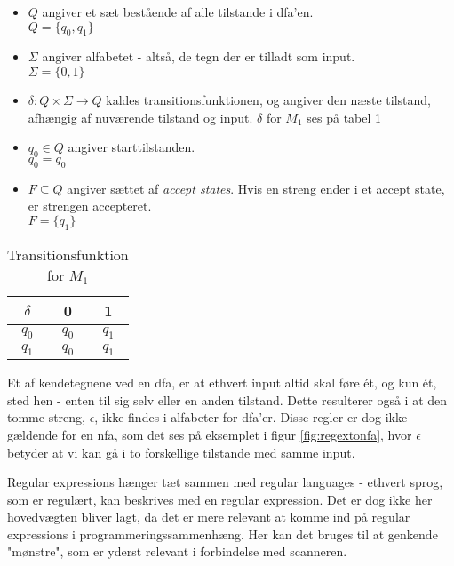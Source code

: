\begin{itemize}
    \item $Q$ angiver et sæt bestående af alle tilstande i \gls{dfa}'en.\\
        $Q = \{q_0, q_1\}$
    \item $\Sigma$ angiver alfabetet - altså, de tegn der er tilladt som input.\\
        $\Sigma = \{0, 1\}$
    \item $\delta: Q \times \Sigma \rightarrow Q$ kaldes transitionsfunktionen, og angiver den næste tilstand, afhængig af nuværende tilstand og input. $\delta$ for $M_1$ ses på tabel \ref{tab:transfunk_m1}
    \item $q_0 \in Q$ angiver starttilstanden.\\
        $q_0 = q_0$
    \item $F \subseteq Q$ angiver sættet af \textit{accept states}. Hvis en streng ender i et accept state, er strengen accepteret.\\
        $F = \{q_1\}$
\end{itemize}

\begin{table}[H]
    \centering
        \begin{tabular}{ c|c c }
        \centering
            $\delta$ & 0 & 1\\ \hline 
            $q_0$ & $q_0$ & $q_1$\\
            $q_1$ & $q_0$ & $q_1$\\
        \end{tabular}
    \caption{Transitionsfunktion for $M_1$}
    \label{tab:transfunk_m1}
\end{table}

\noindent Et af kendetegnene ved en \gls{dfa}, er at ethvert input altid skal føre ét, og kun ét, sted hen - enten til sig selv eller en anden tilstand. Dette resulterer også i at den tomme streng, $\epsilon$, ikke findes i alfabeter for \gls{dfa}'er. Disse regler er dog ikke gældende for en \gls{nfa}, som det ses på eksemplet i figur \ref{fig:regextonfa}, hvor $\epsilon$ betyder at vi kan gå i to forskellige tilstande med samme input.

Regular expressions hænger tæt sammen med regular languages - ethvert sprog, som er regulært, kan beskrives med en regular expression. Det er dog ikke her hovedvægten bliver lagt, da det er mere relevant at komme ind på regular expressions i programmeringssammenhæng. Her kan det bruges til at genkende "mønstre"\mbox{}, som er yderst relevant i forbindelse med scanneren. 

